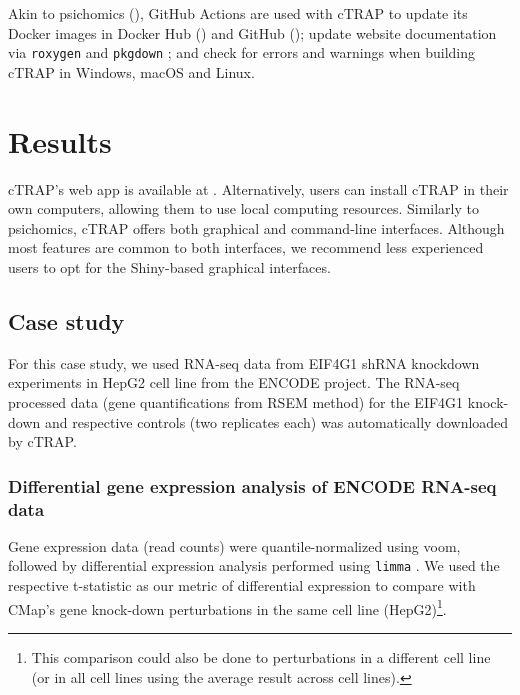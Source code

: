 Akin to psichomics (), GitHub Actions are used with cTRAP to update its Docker images in Docker Hub () and GitHub (); update website documentation via \texttt{roxygen} \cite{wickham:2021wt} and \texttt{pkgdown} \cite{wickham:2021wj}; and check for errors and warnings when building cTRAP in Windows, macOS and Linux.

\section{Results}

cTRAP's web app is available at . Alternatively, users can install cTRAP in their own computers, allowing them to use local computing resources. Similarly to psichomics, cTRAP offers both graphical and command-line interfaces. Although most features are common to both interfaces, we recommend less experienced users to opt for the Shiny-based graphical interfaces.

\subsection{Case study}

For this case study, we used RNA-seq data from EIF4G1 shRNA knockdown experiments in HepG2 cell line from the ENCODE project. The RNA-seq processed data (gene quantifications from RSEM method) for the EIF4G1 knock-down and respective controls (two replicates each) was automatically downloaded by cTRAP.

\subsubsection{Differential gene expression analysis of ENCODE RNA-seq data}

Gene expression data (read counts) were quantile-normalized using voom, followed by differential expression analysis performed using \texttt{limma} \cite{ritchie:2015tm}. We used the respective t-statistic as our metric of differential expression to compare with CMap’s gene knock-down perturbations in the same cell line (HepG2)\footnote{This comparison could also be done to perturbations in a different cell line (or in all cell lines using the average result across cell lines).}.


